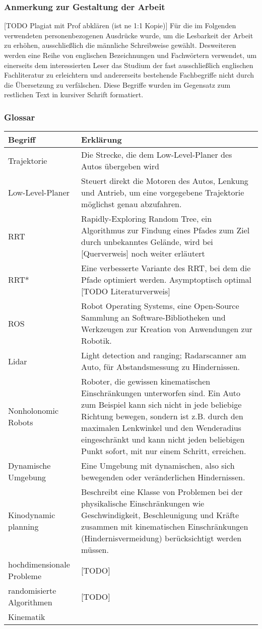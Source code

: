 \subsubsection{Anmerkung zur Gestaltung der Arbeit}
[TODO Plagiat mit Prof abklären (ist ne 1:1 Kopie)]
Für die im Folgenden verwendeten personenbezogenen
Ausdrücke wurde, um die Lesbarkeit der Arbeit zu erhöhen,
ausschließlich die männliche Schreibweise gewählt. Desweiteren werden eine
Reihe von englischen Bezeichnungen und Fachwörtern verwendet, um einerseits dem
interessierten Leser das Studium der fast ausschließlich englischen
Fachliteratur zu erleichtern und andererseits bestehende Fachbegriffe nicht durch die Übersetzung zu verfälschen. Diese Begriffe
wurden im Gegensatz zum restlichen Text in kursiver Schrift formatiert.

\subsubsection{Glossar}
\begin{tabularx}{\textwidth}{l|X}
 \textbf{Begriff}  & \textbf{Erklärung}  \\
\hline Trajektorie & Die Strecke, die dem Low-Level-Planer des Autos übergeben wird\\
Low-Level-Planer & Steuert direkt die Motoren des Autos, Lenkung und Antrieb, um eine vorgegebene Trajektorie möglichst genau abzufahren. \\
RRT & Rapidly-Exploring Random Tree, ein Algorithmus zur Findung eines Pfades zum Ziel durch unbekanntes Gelände, wird bei [Querverweis] noch weiter erläutert\\
RRT* & Eine verbesserte Variante des RRT, bei dem die Pfade optimiert werden. Asymptoptisch optimal [TODO Literaturverweis]\\
ROS & Robot Operating Systems, eine Open-Source Sammlung an Software-Bibliotheken und Werkzeugen zur 	Kreation von Anwendungen zur Robotik. \\
Lidar & Light detection and ranging; Radarscanner am Auto, für Abstandsmessung zu Hindernissen.\\
Nonholonomic Robots & Roboter, die gewissen kinematischen Einschränkungen unterworfen sind. Ein Auto zum Beispiel kann sich nicht in jede beliebige Richtung bewegen, sondern ist z.B. durch den maximalen Lenkwinkel und den Wenderadius eingeschränkt und kann nicht jeden beliebigen Punkt sofort, mit nur einem Schritt, erreichen.  \\
Dynamische Umgebung & Eine Umgebung mit dynamischen, also sich bewegenden oder veränderlichen Hindernissen. \\
Kinodynamic planning & Beschreibt eine Klasse von Problemen bei der physikalische Einschränkungen wie Geschwindigkeit, Beschleunigung und Kräfte zusammen mit kinematischen Einschränkungen (Hindernisvermeidung) berücksichtigt werden müssen. \\
hochdimensionale Probleme & [TODO]\\
randomisierte Algorithmen & [TODO]\\
Kinematik & \\

\end{tabularx} 
